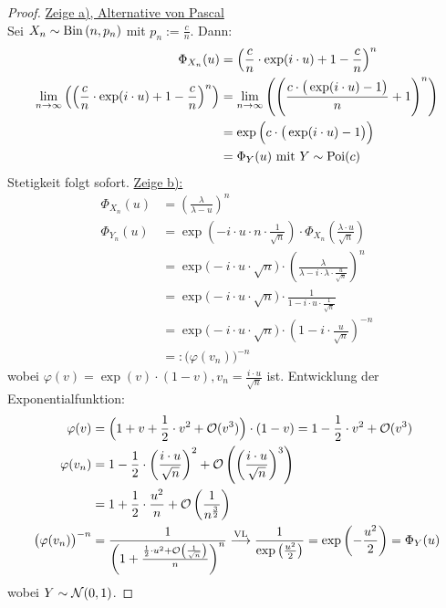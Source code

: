 \begin{proof}
	\underline{Zeige a), Alternative von Pascal}\\
	Sei $X_n\sim\operatorname{Bin}\left(n,p_n\right)$ mit $p_n := \frac{c}{n}$.
	Dann:
	\begin{align*}
		\Phi_{X_n}(u)
		&=\left(\frac{c}{n}\cdot\exp(i\cdot u)+1-\frac{c}{n}\right)^n\\
		\lim\limits_{n\to\infty}\left(\left(\frac{c}{n}\cdot\exp(i\cdot u)+1-\frac{c}{n}\right)^n\right)
		&=\lim\limits_{n\to\infty}\left(\left(\frac{c\cdot\big(\exp(i\cdot u)-1\big)}{n}+1\right)^n\right)\\
		&=\exp\Big(c\cdot\big(\exp(i\cdot u)-1\big)\Big)\\
		&=\Phi_Y(u)\text{ mit } Y\sim\operatorname{Poi}(c)
	\end{align*}
	Stetigkeit folgt sofort.\nl
	\underline{Zeige b):}
	\begin{align*}
		\Phi_{X_n}(u)
		&=\left(\frac{\lambda}{\lambda-u}\right)^n\\
		\Phi_{Y_n}(u)
		&=\exp\left(-i\cdot u\cdot n\cdot\frac{1}{\sqrt{n}}\right)\cdot\Phi_{X_n}\left(\frac{\lambda\cdot u}{\sqrt{n}}\right)\\
		&=\exp\big(-i\cdot u\cdot\sqrt{n})\cdot\left(\frac{\lambda}{\lambda-i\cdot\lambda\cdot\frac{u}{\sqrt{n}}}\right)^n\\
		&=\exp\big(-i\cdot u\cdot\sqrt{n}\big)\cdot\frac{1}{1-i\cdot u\cdot\frac{1}{\sqrt{n}}}\\
		&=\exp\big(-i\cdot u\cdot\sqrt{n}\big)\cdot\left(1-i\cdot\frac{u}{\sqrt{n}}\right)^{-n}\\
		&=:\big(\varphi(v_n)\big)^{-n}
	\end{align*}
	wobei $\varphi(v)=\exp(v)\cdot(1-v),v_n=\frac{i\cdot u}{\sqrt{n}}$ ist.
	Entwicklung der Exponentialfunktion:
	\begin{align*}
		\varphi(v)
		&=\Big(1+v+\frac{1}{2}\cdot v^2+\mathcal{O}(v^3)\Big)\cdot(1-v)
		=1-\frac{1}{2}\cdot v^2+\mathcal{O}(v^3)\\
		\varphi(v_n)
		&=1-\frac{1}{2}\cdot\left(\frac{i\cdot u}{\sqrt{n}}\right)^2+\mathcal{O}\left(\left(\frac{i\cdot u}{\sqrt{n}}\right)^3\right)\\
		&=1+\frac{1}{2}\cdot\frac{u^2}{n}+\mathcal{O}\left(\frac{1}{n^{\frac{3}{2}}}\right)\\
		\big(\varphi(v_n)\big)^{-n}
		&=\frac{1}{\left(1+\frac{\frac{1}{2}\cdot u^2+\mathcal{O}\left(\frac{1}{\sqrt{n}}\right)}{n}\right)^n}
		\overset{\text{VL}}{\longrightarrow}
		\frac{1}{\exp\left(\frac{u^2}{2}\right)}=\exp\left(-\frac{u^2}{2}\right)=\Phi_Y(u)
	\end{align*}
	wobei $Y\sim\mathcal{N}(0,1)$.
	
	
\end{proof}

